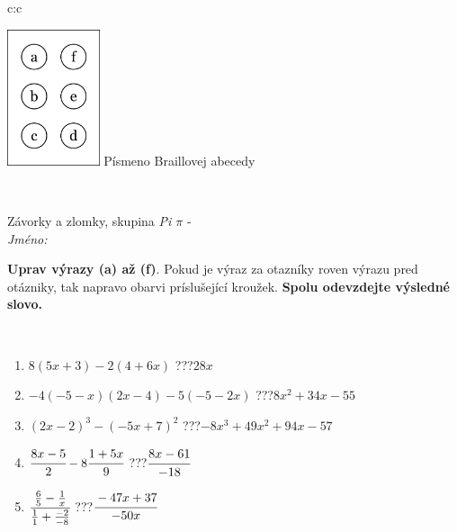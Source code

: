\documentclass[10pt]{report}
\begin{document}
\begin{tabular}{c:c}
\begin{minipage}[c][104.5mm][t]{0.5\linewidth}
\begin{center}
\begin{minipage}{0.20\linewidth}
\begin{center}
\includegraphics[height=40mm]{../images/braille.png}
{\small Písmeno Braillovej abecedy}
\end{center}
\end{minipage}
\end{center}
\end{minipage}
\\ \hdashline
\begin{minipage}[c][104.5mm][t]{0.5\linewidth}
\begin{center}
\vspace{7mm}
{\huge Závorky a zlomky, skupina \textit{Pi $\pi$} -}\\[5mm]
\textit{Jméno:}\phantom{xxxxxxxxxxxxxxxxxxxxxxxxxxxxxxxxxxxxxxxxxxxxxxxxxxxxxxxxxxxxxxxxx}\\[5mm]
\begin{minipage}{0.95\linewidth}
\begin{center}
\textbf{Uprav výrazy (a) až (f)}. Pokud je výraz za otazníky roven výrazu pred otázniky, tak napravo obarvi príslušející kroužek. \textbf{Spolu odevzdejte výsledné slovo.}
\end{center}
\end{minipage}
\\[1mm]
\begin{minipage}{0.79\linewidth}
\begin{center}
\begin{varwidth}{\linewidth}
\begin{enumerate}
\normalsize
\item $8(5x+3)-2(4+6x)$\quad \dotfill\; ???\;\dotfill \quad $28x$
\item $-4(-5-x)(2x-4)-5(-5-2x)$\quad \dotfill\; ???\;\dotfill \quad $8x^2+34x-55$
\item $(2x-2)^3-(-5x+7)^2$\quad \dotfill\; ???\;\dotfill \quad $-8x^3+49x^2+94x-57$
\item $\cfrac{8x-5}{2}-8\cfrac{1+5x}{9}$\quad \dotfill\; ???\;\dotfill \quad $\cfrac{8x-61}{-18}$
\item $\cfrac{\frac{6}{5}-\frac{1}{x}}{\frac{1}{1}+\frac{-2}{-8}}$\quad \dotfill\; ???\;\dotfill \quad $\cfrac{-47x+37}{-50x}$

\end{enumerate}
\end{varwidth}
\end{center}
\end{minipage}
\end{center}
\end{minipage}
\end{tabular}
\end{document}
